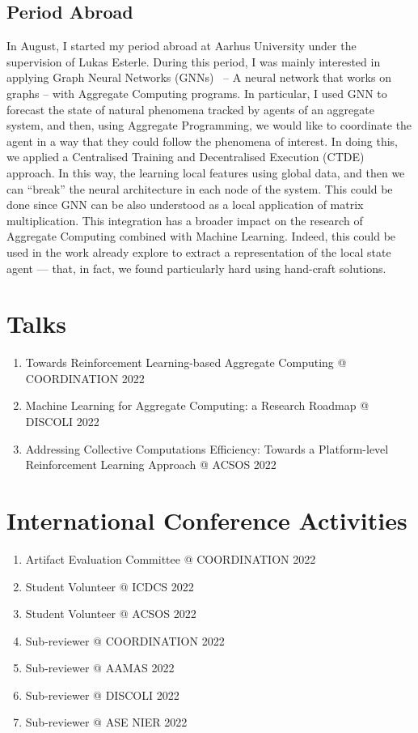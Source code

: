 \documentclass[11pt]{article}
\begin{document}
\subsection{Period Abroad}
In August, I started my period abroad 
 at Aarhus University under the supervision of Lukas Esterle.
%
During this period, I was mainly interested in applying Graph Neural Networks (GNNs)~\cite{scarselli2008graph}
 -- A neural network that works on graphs -- 
 with Aggregate Computing programs.
%
In particular, I used GNN to forecast 
 the state of natural phenomena tracked by agents of an aggregate system, and then, 
 using Aggregate Programming, we would like to coordinate the agent in a way 
 that they could follow the phenomena of interest.
%
In doing this, we applied a Centralised Training and Decentralised Execution (CTDE)~\cite{foerster2018deep} approach. 
%
In this way, the learning local features using global data, 
 and then we can ``break'' the neural architecture in each node of the system.
%
This could be done since GNN can be also understood as a local application of matrix multiplication.
%
This integration has a broader impact on the research of Aggregate Computing combined with Machine Learning. 
%
Indeed, this could be used in the work already 
 explore to extract a representation of the local state agent 
 --- that, in fact, we found particularly hard using hand-craft solutions. 

\section{Talks}
\begin{enumerate}
	\item Towards Reinforcement Learning-based Aggregate Computing @ COORDINATION 2022
	\item Machine Learning for Aggregate Computing: a Research Roadmap @ DISCOLI 2022
	\item Addressing Collective Computations Efficiency: Towards a Platform-level Reinforcement Learning Approach @ ACSOS 2022
\end{enumerate}
\section{International Conference Activities}
\begin{enumerate}
	\item Artifact Evaluation Committee @ COORDINATION 2022
	\item Student Volunteer @ ICDCS 2022
	\item Student Volunteer @ ACSOS 2022
	\item Sub-reviewer @ COORDINATION 2022
	\item Sub-reviewer @ AAMAS 2022
	\item Sub-reviewer @ DISCOLI 2022
	\item Sub-reviewer @ ASE NIER 2022
\end{enumerate}
\end{document}
